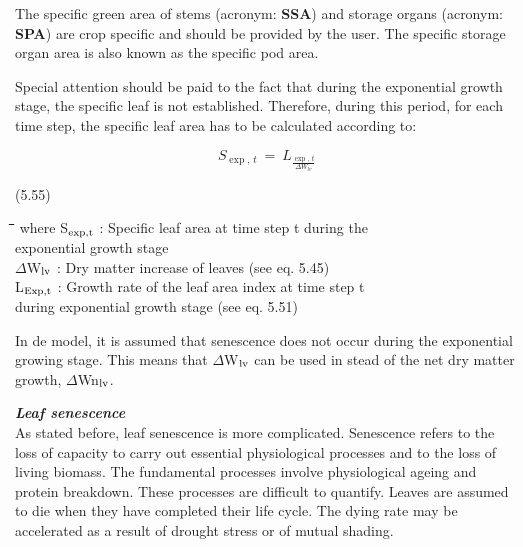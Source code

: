 \documentclass[11pt]{article}
\begin{document}
\bigskip
\bigskip
The specific green area of stems (acronym: {\bf SSA}) and storage organs (acronym: {\bf SPA}) are
crop specific and should be provided by the user. The specific storage organ area is also
known as the specific pod area.

\bigskip
\bigskip
\bigskip
\bigskip
\bigskip
\bigskip
\bigskip
Special attention should be paid to the fact that during the exponential growth stage, the
specific leaf is not established. Therefore, during this period, for each time step, the
specific leaf area has to be calculated according to:

\begin{displaymath}
S _{\exp ,\, t} ~=~L _{\frac{\exp ,\, t}{\Delta W _{lv} }}
\end{displaymath}

 \bigskip
\strut\hfill (5.55)

\nwln
\begin{tabbing}
\hspace{1.27cm}\=\hspace{1.27cm}\=\hspace{1.27cm}\=\hspace{1.27cm}\=%
\hspace{1.27cm}\=\hspace{1.27cm}\=\hspace{1.27cm}\=\hspace{1.27cm}\=%
\hspace{1.27cm}\=\hspace{1.27cm}\=\kill
where\> S$_{{\rm exp,t}}$\> : Specific leaf area at time step t during the \\
\>\>   exponential growth stage \> \> \> \> \> \> \> \> [ha kg$^{{\rm -1}}$]\\
\>$\Delta$W$_{{\rm lv}}$\> : Dry matter increase of leaves (see eq. 5.45)\> \> \> \> \> \> \> \> [kg ha$_{{\rm -1}}$ d$^{{\rm -1}}$]\\
\>L$_{{\rm Exp,t}}$\> : Growth rate of the leaf area index at time step t\\
\>\>   during exponential growth stage (see eq. 5.51)\> \> \> \> \> \> \> \> [ha ha$^{{\rm -1}}$ d$^{{\rm -1}}$]
\end{tabbing}

 \bigskip
In de model, it is assumed that senescence does not occur during the exponential growing
stage. This means that $\Delta$W$_{{\rm lv}}$ can be used in stead of the net dry matter growth, $\Delta$Wn$_{{\rm lv}}$.

\bigskip
\bigskip
{\bf {\it Leaf senescence\/}}\\
As stated before, leaf senescence is more complicated. Senescence refers to the loss of
capacity to carry out essential physio\-logical processes and to the loss of living biomass.
The fundamental processes involve physiological ageing and protein breakdown. These
processes are difficult to quantify. Leaves are assumed to die when they have completed
their life cycle. The dying rate may be accelerated as a result of drought stress or of
mutual shading.
\end{document}
